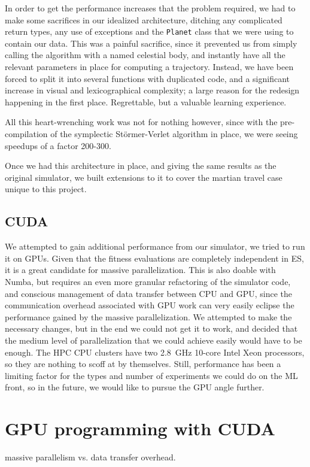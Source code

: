 In order to get the performance increases that the problem required, we had to make some sacrifices in our idealized architecture, ditching any complicated return types, any use of exceptions and the \texttt{Planet} class that we were using to contain our data. This was a painful sacrifice, since it prevented us from simply calling the algorithm with a named celestial body, and instantly have all the relevant parameters in place for computing a trajectory. Instead, we have been forced to split it into several functions with duplicated code, and a significant increase in visual and lexicographical complexity; a large reason for the redesign happening in the first place. Regrettable, but a valuable learning experience.

All this heart-wrenching work was not for nothing however, since with the pre-compilation of the symplectic Störmer-Verlet algorithm in place, we were seeing speedups of a factor 200-300. 

Once we had this architecture in place, and giving the same results as the original simulator, we built extensions to it to cover the martian travel case unique to this project.

\subsection{CUDA}

We attempted to gain additional performance from our simulator, we tried to run it on GPUs. Given that the fitness evaluations are completely independent in ES, it is a great candidate for massive parallelization. This is also doable with Numba, but requires an even more granular refactoring of the simulator code, and conscious management of data transfer between CPU and GPU, since the communication overhead associated with GPU work can very easily eclipse the performance gained by the massive parallelization. We attempted to make the necessary changes, but in the end we could not get it to work, and decided that the medium level of parallelization that we could achieve easily would have to be enough. The HPC CPU clusters have two \SI{2.8}{\GHz} 10-core Intel Xeon processors, so they are nothing to scoff at by themselves. Still, performance has been a limiting factor for the types and number of experiments we could do on the ML front, so in the future, we would like to pursue the GPU angle further.

\section{GPU programming with CUDA}
massive parallelism vs. data transfer overhead.

